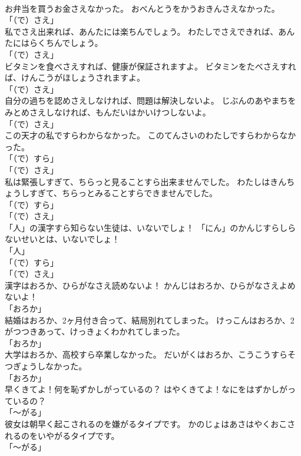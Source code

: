 \documentclass[8pt]{extreport}
\begin{document}
\begin{CJK}{UTF8}{min}
\\	お弁当を買うお金さえなかった。	おべんとうをかうおきんさえなかった。	
\\	「（で）さえ」 
\\	私でさえ出来れば、あんたには楽ちんでしょう。	わたしでさえできれば、あんたにはらくちんでしょう。	
\\	「（で）さえ」 
\\	ビタミンを食べさえすれば、健康が保証されますよ。	ビタミンをたべさえすれば、けんこうがほしょうされますよ。	
\\	「（で）さえ」 
\\	自分の過ちを認めさえしなければ、問題は解決しないよ。	じぶんのあやまちをみとめさえしなければ、もんだいはかいけつしないよ。	
\\	「（で）さえ」 
\\	この天才の私ですらわからなかった。	このてんさいのわたしですらわからなかった。	
\\	「（で）すら」 
\\	「（で）さえ」 
\\	私は緊張しすぎて、ちらっと見ることすら出来ませんでした。	わたしはきんちょうしすぎて、ちらっとみることすらできませんでした。	
\\	「（で）すら」 
\\	「（で）さえ」 
\\	「人」の漢字すら知らない生徒は、いないでしょ！	「にん」のかんじすらしらないせいとは、いないでしょ！	
\\	「人」 
\\	「（で）すら」 
\\	「（で）さえ」 
\\	漢字はおろか、ひらがなさえ読めないよ！	かんじはおろか、ひらがなさえよめないよ！	
\\	「おろか」 
\\	結婚はおろか、2ヶ月付き合って、結局別れてしまった。	けっこんはおろか、2がつつきあって、けっきょくわかれてしまった。	
\\	「おろか」 
\\	大学はおろか、高校すら卒業しなかった。	だいがくはおろか、こうこうすらそつぎょうしなかった。	
\\	「おろか」 
\\	早くきてよ！何を恥ずかしがっているの？	はやくきてよ！なにをはずかしがっているの？	
\\	「～がる」	
\\	彼女は朝早く起こされるのを嫌がるタイプです。	かのじょはあさはやくおこされるのをいやがるタイプです。	
\\	「～がる」	

\end{CJK}
\end{document}
